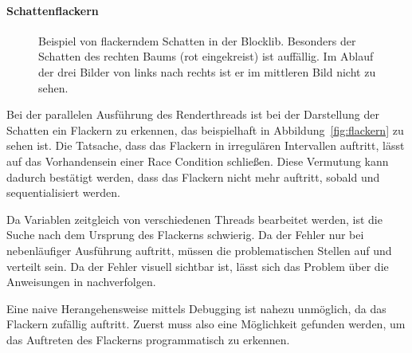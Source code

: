 \paragraph{Schattenflackern}
\begin{figure}
	\hfill
	\hfill
	\caption{Beispiel von flackerndem Schatten in der Blocklib. Besonders der Schatten des rechten Baums (rot eingekreist) ist auffällig. Im Ablauf der drei Bilder von links nach rechts ist er im mittleren Bild nicht zu sehen.}\label{fig:flackern}
\end{figure}
Bei der parallelen Ausführung des Renderthreads ist bei der Darstellung der Schatten ein Flackern zu erkennen, das beispielhaft in Abbildung~\vref{fig:flackern} zu sehen ist. Die Tatsache, dass das Flackern in irregulären Intervallen auftritt, lässt auf das Vorhandensein einer Race Condition schließen. Diese Vermutung kann dadurch bestätigt werden, dass das Flackern nicht mehr auftritt, sobald  und  sequentialisiert werden.

Da Variablen zeitgleich von verschiedenen Threads bearbeitet werden, ist die Suche nach dem Ursprung des Flackerns schwierig. Da der Fehler nur bei nebenläufiger Ausführung auftritt, müssen die problematischen Stellen auf  und  verteilt sein. Da der Fehler visuell sichtbar ist, lässt sich das Problem über die Anweisungen in  nachverfolgen. 

Eine naive Herangehensweise mittels Debugging ist nahezu unmöglich, da das Flackern zufällig auftritt. Zuerst muss also eine Möglichkeit gefunden werden, um das Auftreten des Flackerns programmatisch zu erkennen.

